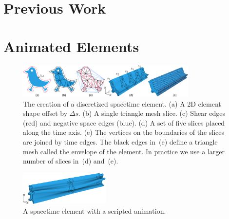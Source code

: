 \section{Previous Work}
\label{animationpak_previous_work}





\section{Animated Elements}
\label{animationpak_animated_element}

\begin{figure}
\centering
\includegraphics[width=0.8\textwidth]{figures/animationpak/discretization.pdf} 
\caption[The creation of a discretized spacetime element]
{\label{fig_animationpak_discretization} 
The creation of a discretized spacetime element.  
(a) A 2D element shape offset by $\Delta s$.
(b) A single triangle mesh slice.
(c) Shear edges (red) and negative space edges (blue).
(d) A set of five slices placed along the time axis.
(e) The vertices on the boundaries of the slices are joined by 
	time edges.  The black edges in~(e) define a triangle mesh
	called the envelope of the element.
	In practice we use a larger number of slices in~(d) and~(e).
}
\end{figure}

\begin{figure}
\centering
\includegraphics[width=0.4\textwidth]{figures/animationpak/spacetime_element.pdf} 
\caption[A spacetime element with a scripted animation]
{\label{fig_animationpak_spacetime_element} 
A spacetime element with a scripted animation.}
\end{figure}

